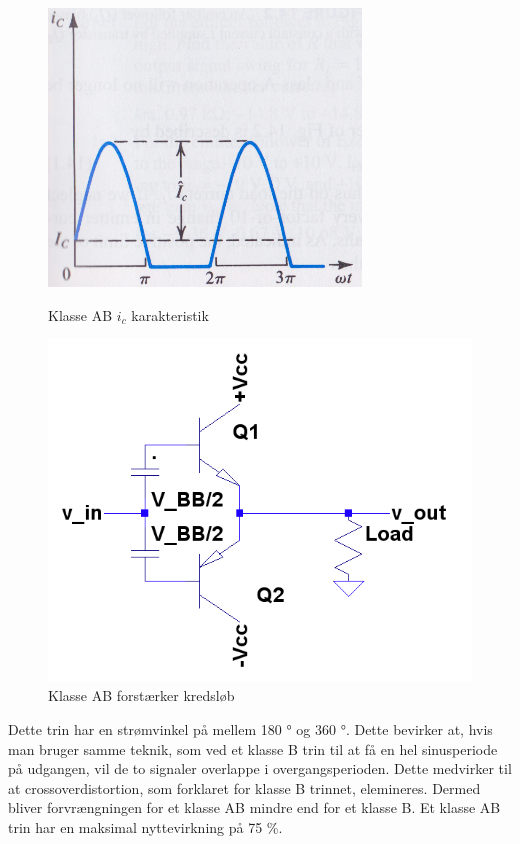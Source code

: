 \begin{figure}[ht]
\begin{minipage}[b]{0.5\linewidth}
\centering
\includegraphics[scale=.35]{indledende_analyse/klasser/klasseab.png}
\caption{Klasse AB $i_c$ karakteristik}
\label{fig:klasseab}
\end{minipage}
\hspace{0.5cm}
\begin{minipage}[b]{0.5\linewidth}
\centering
\includegraphics[scale=.35]{indledende_analyse/klasser/classab.png}
\caption{Klasse AB forstærker kredsløb}
\label{fig:classab}
\end{minipage}
\end{figure}


Dette trin har en strømvinkel på mellem 180 ° og 360 °. Dette bevirker at, hvis man bruger samme teknik, som ved et klasse B trin til at få en hel sinusperiode på udgangen, vil de to signaler overlappe i overgangsperioden. Dette medvirker til at crossoverdistortion, som forklaret for klasse B trinnet, elemineres. Dermed bliver forvrængningen for et klasse AB mindre end for et klasse B.
Et klasse AB trin har en maksimal nyttevirkning på 75 \%.

